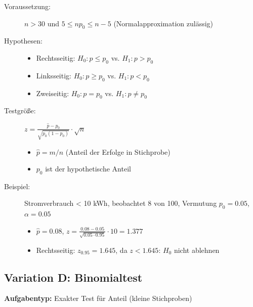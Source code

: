 \documentclass[12pt, a4paper, titlepage, ngerman]{scrartcl}
\begin{document}
\begin{description}
  \item[Voraussetzung:] $n > 30$ und $5 \leq np_0 \leq n-5$ (Normalapproximation zulässig)
  \item[Hypothesen:] 
    \begin{itemize}
      \item Rechtsseitig: $H_0: p \leq p_0$ vs. $H_1: p > p_0$
      \item Linksseitig: $H_0: p \geq p_0$ vs. $H_1: p < p_0$
      \item Zweiseitig: $H_0: p = p_0$ vs. $H_1: p \neq p_0$
    \end{itemize}
  \item[Testgröße:] $z = \frac{\hat{p} - p_0}{\sqrt{p_0(1-p_0)}} \cdot \sqrt{n}$
    \begin{itemize}
      \item $\hat{p} = m/n$ (Anteil der Erfolge in Stichprobe)
      \item $p_0$ ist der hypothetische Anteil
    \end{itemize}
  \item[Beispiel:] Stromverbrauch < 10 kWh, beobachtet 8 von 100, Vermutung $p_0 = 0.05$, $\alpha = 0.05$
    \begin{itemize}
      \item $\hat{p} = 0.08$, $z = \frac{0.08 - 0.05}{\sqrt{0.05 \cdot 0.95}} \cdot 10 = 1.377$
      \item Rechtsseitig: $z_{0.95} = 1.645$, da $z < 1.645$: $H_0$ nicht ablehnen
    \end{itemize}
\end{description}

\subsection{Variation D: Binomialtest}

\textbf{Aufgabentyp:} Exakter Test für Anteil (kleine Stichproben)
\end{document}
